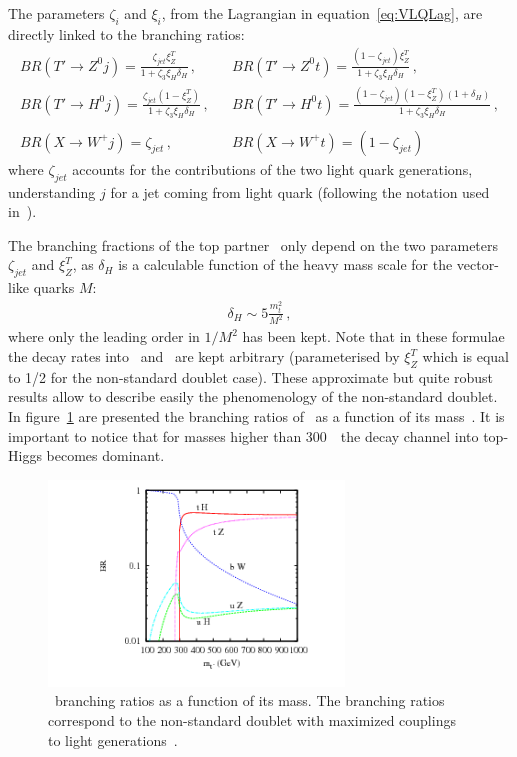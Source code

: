 The parameters $\zeta_{i}$ and $\xi_i$, from the Lagrangian in equation~\ref{eq:VLQLag}, are directly linked to the branching ratios:
 \begin{eqnarray} 
BR (T' \to Z^{0} j) = \frac{\zeta_{jet} \xi^T_Z}{1+\zeta_3 \xi_H \delta_H}\,, & & BR (T' \to Z^{0} t) = \frac{(1-\zeta_{jet}) \xi^T_Z}{1+\zeta_3 
\xi_H \delta_H}\,,\\
BR(T' \to H^{0} j) = \frac{\zeta_{jet} (1-\xi^T_Z)}{1+\zeta_3 \xi_H \delta_H}\,, & &  BR(T' \to H^{0} t) = \frac{(1-\zeta_{jet})
(1-\xi^T_Z) (1+\delta_H)}{1+\zeta_3 \xi_H \delta_H}\,, \nonumber\\
 & & \nonumber \\
BR(X \to W^{+} j) = \zeta_{jet}\,, & & BR(X \to W^{+} t) = (1-\zeta_{jet})
 \end{eqnarray} where $\zeta_{jet}$ accounts for the contributions of the two light quark generations, understanding $j$ for a jet coming from light quark (following the notation used in~\cite{Buchkremer:2013bha}).

The branching fractions of the top partner \Tp~only depend on the two parameters $\zeta_{jet}$ and $\xi_Z^{T}$, as $\delta_H$ is a calculable function of the heavy mass scale for the vector-like quarks $M$:
\begin{eqnarray} 
\delta_H  \sim 5 \frac{m^2_t}{M^2}\,, \label{eq:deltaH}
\end{eqnarray} 
where only the leading order in $1/M^2$ has been kept. Note that in these formulae the decay rates into \Z~and \Hb~are kept arbitrary (parameterised by $\xi_Z^{T}$ which is equal to 1/2 for the non-standard doublet case). These approximate but quite robust results allow to describe easily the phenomenology of the non-standard doublet. In figure~\ref{fig:TBRs} are presented the branching ratios of \Tp~as a function of its mass~\cite{Cacciapaglia:2011fx}. It is important to notice that for masses higher than 300~\GeVcc~the decay channel into top-Higgs becomes dominant.

\begin{figure}[!Hhtbp]
  \begin{center}
    \includegraphics[width=0.7\textwidth]{figs/pheno_br_tp.png}
    \caption{\Tp~branching ratios as a function of its mass. The branching ratios correspond to the non-standard doublet with maximized couplings to light generations~\cite{Cacciapaglia:2011fx}.}
    \label{fig:TBRs}
  \end{center}
\end{figure}

